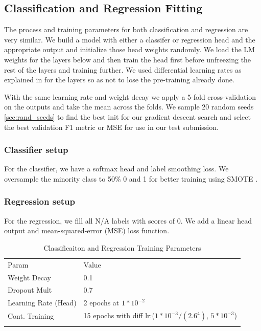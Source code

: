 \documentclass[smallcondensed]{svjour3}     %
\begin{document}
\subsection{Classification and Regression Fitting}
The process and training parameters for both classification and regression are very similar. We build a model with either a classifer or regression head and the appropriate output and initialize those head weights randomly.  We load the LM weights for the layers below and then train the head first before unfreezing the rest of the layers and training further. We used differential learning rates as explained in \cite{HowarRuder:DBLP:journals/corr/abs-1801-06146} for the layers so as not to lose the pre-training already done.  

With the same learning rate and weight decay we apply a 5-fold cross-validation on the outputs and take the mean across the folds.  We sample 20 random seeds \ref{sec:rand_seeds} to find the best init for our gradient descent search and select the best validation F1 metric or MSE for use in our test submission.
\subsubsection{Classifier setup}  For the classifier, we have a softmax head and label smoothing loss.  We oversample the minority class to 50\% 0 and 1 for better training using SMOTE \cite{Chawla:2002:SSM:1622407.1622416}.  
\subsubsection{Regression setup}  For the regression, we fill all N/A labels with scores of 0.  We add a linear head output and mean-squared-error (MSE) loss function. 

\begin{table}[ht]
	\caption{Classificaiton and Regression Training Parameters}
	\label{tab:clas_training}       %
	\begin{tabular}{ll}
		\hline\noalign{\smallskip}
		Param & Value \\
		\noalign{\smallskip}\hline\noalign{\smallskip}
		Weight Decay & 0.1  \\
		Dropout Mult &  0.7 \\
		Learning Rate (Head)& 2 epochs at $1*10^{-2}$\\
		Cont. Training & 15 epochs with diff lr:($1*10^{-3}/(2.6^4)$, $5*10^{-3}$)\\
		\noalign{\smallskip}\hline
	\end{tabular}
\end{table}
\end{document}
